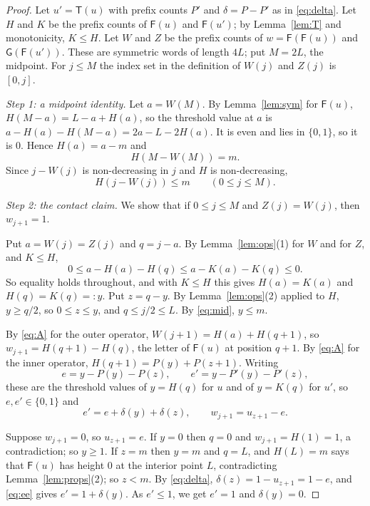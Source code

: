 \documentclass[11pt]{amsart}
\theoremstyle{definition}
\theoremstyle{remark}
\numberwithin{equation}{section}
\newcommand{\cF}{\mathsf F}
\newcommand{\cG}{\mathsf G}
\newcommand{\cT}{\mathsf T}
\begin{document}
\begin{proof}
Let $u'=\cT(u)$ with prefix counts $P'$ and $\delta=P-P'$ as in \eqref{eq:delta}. Let $H$ and $K$ be the prefix counts of $\cF(u)$ and $\cF(u')$; by Lemma~\ref{lem:T} and monotonicity, $K\le H$. Let $W$ and $Z$ be the prefix counts of $w=\cF(\cF(u))$ and $\cG(\cF(u'))$. These are symmetric words of length $4L$; put $M=2L$, the midpoint. For $j\le M$ the index set in the definition of $W(j)$ and $Z(j)$ is $[0,j]$.

\smallskip\noindent\emph{Step 1: a midpoint identity.} Let $a=W(M)$. By Lemma~\ref{lem:sym} for $\cF(u)$, $H(M-a)=L-a+H(a)$, so the threshold value at $a$ is $a-H(a)-H(M-a)=2a-L-2H(a)$. It is even and lies in $\{0,1\}$, so it is $0$. Hence $H(a)=a-m$ and
\[
H(M-W(M))=m.
\]
Since $j-W(j)$ is non-decreasing in $j$ and $H$ is non-decreasing,
\begin{equation}\label{eq:mid}
H(j-W(j))\le m\qquad(0\le j\le M).
\end{equation}

\smallskip\noindent\emph{Step 2: the contact claim.} We show that if $0\le j\le M$ and $Z(j)=W(j)$, then $w_{j+1}=1$.

Put $a=W(j)=Z(j)$ and $q=j-a$. By Lemma~\ref{lem:ops}(1) for $W$ and for $Z$, and $K\le H$,
\[
0\le a-H(a)-H(q)\le a-K(a)-K(q)\le0.
\]
So equality holds throughout, and with $K\le H$ this gives $H(a)=K(a)$ and $H(q)=K(q)=:y$. Put $z=q-y$. By Lemma~\ref{lem:ops}(2) applied to $H$, $y\ge q/2$, so $0\le z\le y$, and $q\le j/2\le L$. By \eqref{eq:mid}, $y\le m$.

By \eqref{eq:A} for the outer operator, $W(j+1)=H(a)+H(q+1)$, so $w_{j+1}=H(q+1)-H(q)$, the letter of $\cF(u)$ at position $q+1$. By \eqref{eq:A} for the inner operator, $H(q+1)=P(y)+P(z+1)$. Writing
\[
e=y-P(y)-P(z),\qquad e'=y-P'(y)-P'(z),
\]
these are the threshold values of $y=H(q)$ for $u$ and of $y=K(q)$ for $u'$, so $e,e'\in\{0,1\}$ and
\begin{equation}\label{eq:ee}
e'=e+\delta(y)+\delta(z),\qquad w_{j+1}=u_{z+1}-e.
\end{equation}

Suppose $w_{j+1}=0$, so $u_{z+1}=e$. If $y=0$ then $q=0$ and $w_{j+1}=H(1)=1$, a contradiction; so $y\ge1$. If $z=m$ then $y=m$ and $q=L$, and $H(L)=m$ says that $\cF(u)$ has height $0$ at the interior point $L$, contradicting Lemma~\ref{lem:props}(2); so $z<m$. By \eqref{eq:delta}, $\delta(z)=1-u_{z+1}=1-e$, and \eqref{eq:ee} gives $e'=1+\delta(y)$. As $e'\le1$, we get $e'=1$ and $\delta(y)=0$.


\end{proof}
\end{document}
